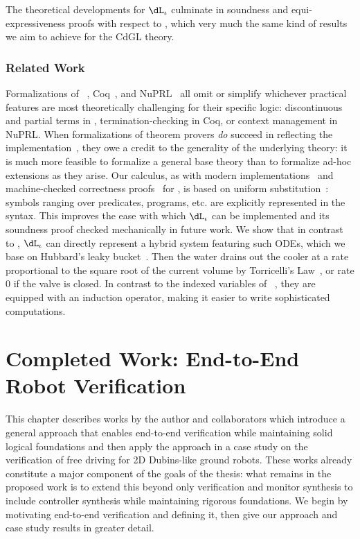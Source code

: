 \documentclass[12pt]{cmuthesis}
\theoremstyle{definition}
\theoremstyle{remark}
\newcommand{\CdGL}{\textsf{CdGL}\xspace}
\newcommand{\dLi}{\ensuremath{\dL_\iota}\xspace}
\begin{document}
The theoretical developments for \dLi culminate in soundness and equi-expressiveness proofs with respect to \dL, which very much the same kind of results we aim to achieve for the \CdGL theory.

\subsection{Related Work}
Formalizations of \KeYmaeraX~\cite{DBLP:conf/pldi/BohrerTMMP18}, Coq~\cite{DBLP:journals/jfrea/Barras10}, and NuPRL~\cite{DBLP:conf/itp/AnandR14} all omit or simplify whichever practical features are most theoretically challenging for their specific logic: discontinuous and partial terms in \KeYmaeraX, termination-checking in Coq, or context management in NuPRL.
When formalizations of theorem provers \emph{do} succeed in reflecting the implementation~\cite{DBLP:journals/jar/KumarAMO16}, they owe a credit to the generality of the underlying theory: it is much more feasible to formalize a general base theory than to formalize ad-hoc extensions as they arise.
Our calculus, as with modern implementations~\cite{DBLP:conf/cade/FultonMQVP15} and machine-checked correctness proofs~\cite{DBLP:conf/cpp/BohrerRVVP17} for \dL, is based on uniform substitution~\cite[\S35,\S40]{Church:1956}: symbols ranging over predicates, programs, etc. are explicitly represented in the syntax.
This improves the ease with which \dLi can be implemented and its soundness proof checked mechanically in future work.
We show that in contrast to \dL, \dLi can directly represent a hybrid system featuring such ODEs, which we base on Hubbard's leaky bucket~\cite[\S4.2]{Hubbard}.
Then the water drains out the cooler at a rate proportional to the square root of the current volume  by Torricelli's Law~\cite{driver1998torricelli}, or rate 0 if the valve is closed.
In contrast to the indexed variables of \QdL~\cite{DBLP:journals/lmcs/Platzer12b}, they are equipped with an induction operator, making it easier to write sophisticated computations.

\chapter{Completed Work:  End-to-End Robot Verification}
\label{ch:end-to-end-v}
This chapter describes  works by the author and collaborators which introduce a general approach that enables end-to-end verification while maintaining solid logical foundations and then apply the approach in a case study on the verification of free driving for 2D Dubins-like ground robots.
These works already constitute a major component of the goals of the thesis: what remains in the proposed work is to extend this beyond only verification and monitor synthesis to include controller synthesis while maintaining rigorous foundations.
We begin by motivating end-to-end verification and defining it, then give our approach and case study results in greater detail.
\end{document}
